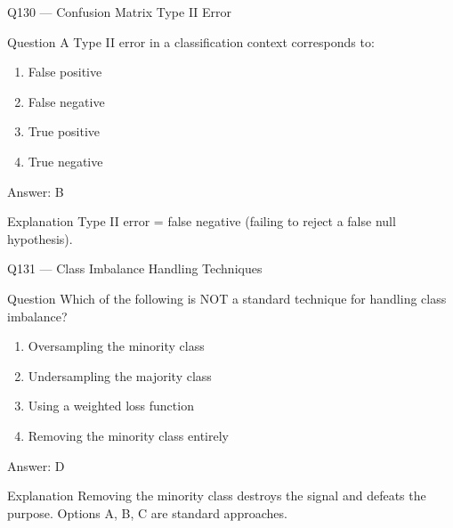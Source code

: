 \documentclass[aspectratio=169,8pt]{beamer}
\begin{document}
	\begin{frame}{Q130 --- Confusion Matrix Type II Error}
		\begin{block}{Question}
			A Type II error in a classification context corresponds to:
			\begin{enumerate}
				\item False positive
				\item False negative
				\item True positive
				\item True negative
			\end{enumerate}
		\end{block}
		\begin{exampleblock}{Answer: B}\end{exampleblock}
		\begin{block}{Explanation}
			Type II error = false negative (failing to reject a false null hypothesis).
		\end{block}
	\end{frame}
	
	\begin{frame}{Q131 --- Class Imbalance Handling Techniques}
		\begin{block}{Question}
			Which of the following is NOT a standard technique for handling class imbalance?
			\begin{enumerate}
				\item Oversampling the minority class
				\item Undersampling the majority class
				\item Using a weighted loss function
				\item Removing the minority class entirely
			\end{enumerate}
		\end{block}
		\begin{exampleblock}{Answer: D}\end{exampleblock}
		\begin{block}{Explanation}
			Removing the minority class destroys the signal and defeats the purpose. Options A, B, C are standard approaches.
		\end{block}
	\end{frame}
	
\end{document}

